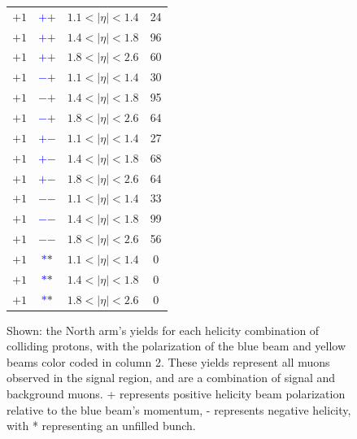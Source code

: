 \begin{figure}
\begin{minipage}[c]{0.67\textwidth}
\begin{tabular}{cccc}
      $+1$ &\textbf{\textcolor{blue}{$+$}\textcolor{ucrgold}{$+$}} & $1.1 < \vert\eta\vert < 1.4$ & 24 \\
      $+1$ &\textbf{\textcolor{blue}{$+$}\textcolor{ucrgold}{$+$}} & $1.4 < \vert\eta\vert < 1.8$ & 96 \\
      $+1$ &\textbf{\textcolor{blue}{$+$}\textcolor{ucrgold}{$+$}} & $1.8 < \vert\eta\vert < 2.6$ & 60 \\
      $+1$ &\textbf{\textcolor{blue}{$-$}\textcolor{ucrgold}{$+$}} & $1.1 < \vert\eta\vert < 1.4$ & 30 \\
      $+1$ &\textbf{\textcolor{blue}{$-$}\textcolor{ucrgold}{$+$}} & $1.4 < \vert\eta\vert < 1.8$ & 95 \\
      $+1$ &\textbf{\textcolor{blue}{$-$}\textcolor{ucrgold}{$+$}} & $1.8 < \vert\eta\vert < 2.6$ & 64 \\
      $+1$ &\textbf{\textcolor{blue}{$+$}\textcolor{ucrgold}{$-$}} & $1.1 < \vert\eta\vert < 1.4$ & 27 \\
      $+1$ &\textbf{\textcolor{blue}{$+$}\textcolor{ucrgold}{$-$}} & $1.4 < \vert\eta\vert < 1.8$ & 68 \\
      $+1$ &\textbf{\textcolor{blue}{$+$}\textcolor{ucrgold}{$-$}} & $1.8 < \vert\eta\vert < 2.6$ & 64 \\
      $+1$ &\textbf{\textcolor{blue}{$-$}\textcolor{ucrgold}{$-$}} & $1.1 < \vert\eta\vert < 1.4$ & 33 \\
      $+1$ &\textbf{\textcolor{blue}{$-$}\textcolor{ucrgold}{$-$}} & $1.4 < \vert\eta\vert < 1.8$ & 99 \\
      $+1$ &\textbf{\textcolor{blue}{$-$}\textcolor{ucrgold}{$-$}} & $1.8 < \vert\eta\vert < 2.6$ & 56 \\
      $+1$ &\textbf{\textcolor{blue}{$*$}\textcolor{ucrgold}{$*$}} & $1.1 < \vert\eta\vert < 1.4$ & 0 \\
      $+1$ &\textbf{\textcolor{blue}{$*$}\textcolor{ucrgold}{$*$}} & $1.4 < \vert\eta\vert < 1.8$ & 0 \\
      $+1$ &\textbf{\textcolor{blue}{$*$}\textcolor{ucrgold}{$*$}} & $1.8 < \vert\eta\vert < 2.6$ & 0 \\
      \bottomrule
    \end{tabular}
  \end{minipage}\hfill
  \begin{minipage}[c]{0.3\textwidth}
    \caption{
      Shown: the North arm's yields for each helicity combination of colliding
      protons, with the polarization of the blue beam and yellow beams color
      coded in column 2. These yields represent all muons observed in the signal
      region, and are a combination of signal and background muons. + represents
      positive helicity beam polarization relative to the blue beam's momentum,
      - represents negative helicity, with * representing an unfilled bunch.
    }
    \label{tab:north_sorted_muons_eta_bins}
  \end{minipage}
\end{figure}

